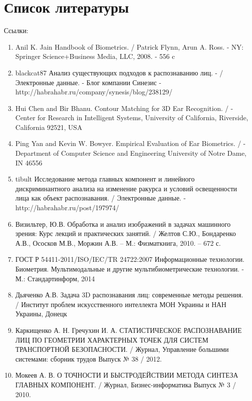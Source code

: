 \documentclass[12pt,a4paper]{article}					%
\begin{document}

\section{Список литературы}


Ссылки:

\begin{enumerate}

\item Anil K. Jain Handbook of Biometrics. / Patrick Flynn, Arun A. Ross. - NY: Springer Science+Business Media, LLC, 2008. - 556 c

\item blackcat87 Анализ существующих подходов к распознаванию лиц. - / Электронные данные. - Блог компании Синезис - \\ http://habrahabr.ru/company/synesis/blog/238129/

\item Hui Chen and Bir Bhanu. Contour Matching for 3D Ear Recognition. / - Center for Research in Intelligent Systems, University of California, Riverside, California 92521, USA

\item Ping Yan and Kevin W. Bowyer. Empirical Evaluation of Ear Biometrics. / - Department of Computer Science and Engineering
University of Notre Dame, IN 46556

\item tibult Исследование метода главных компонент и линейного дискриминантного анализа на изменение ракурса и условий освещенности лица как объект распознавания. / Электронные данные. - http://habrahabr.ru/post/197974/

\item Визильтер, Ю.В. Обработка и анализ изображений в задачах машинного зрения: Курс лекций и практических занятий. / Желтов С.Ю., Бондаренко А.В., Ососков М.В., Моржин А.В. – М.: Физматкнига, 2010. – 672 с.

\item ГОСТ Р 54411-2011/ISO/IEC/TR 24722:2007 Информационные технологии. Биометрия. Мультимодальные и другие мультибиометрические технологии. - М.: Стандартинформ, 2014

\item Дьяченко А.В. Задача 3D распознавания лиц: современные методы решения. / Институт проблем искусственного интеллекта МОН Украины и НАН Украины, Донецк

\item Каркищенко А. Н. Гречухин И. А. СТАТИСТИЧЕСКОЕ РАСПОЗНАВАНИЕ ЛИЦ ПО ГЕОМЕТРИИ ХАРАКТЕРНЫХ ТОЧЕК ДЛЯ СИСТЕМ ТРАНСПОРТНОЙ БЕЗОПАСНОСТИ. / Журнал, Управление большими системами: сборник трудов Выпуск № 38 / 2012.

\item Мокеев А. В. О ТОЧНОСТИ И БЫСТРОДЕЙСТВИИ МЕТОДА СИНТЕЗА ГЛАВНЫХ КОМПОНЕНТ. / Журнал, Бизнес-информатика Выпуск № 3 / 2010.

\end{enumerate}
\end{document}
